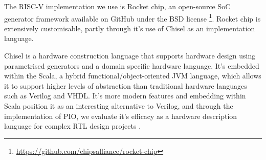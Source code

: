 The RISC-V implementation we use is Rocket chip, an open-source SoC generator framework available on GitHub under the BSD license \footnote{\url{https://github.com/chipsalliance/rocket-chip}}. Rocket chip is extensively customisable, partly through it's use of Chisel as an implementation language.

Chisel is a hardware construction language that supports hardware design using parametrised generators and a domain specific hardware language. It's embedded within the Scala, a hybrid functional/object-oriented JVM language, which allows it to support higher levels of abstraction than traditional hardware languages such as Verilog and VHDL. It's more modern features and embedding within Scala position it as an interesting alternative to Verilog, and through the implementation of PIO, we evaluate it's efficacy as a hardware description language for complex RTL design projects \cite{chisel}.